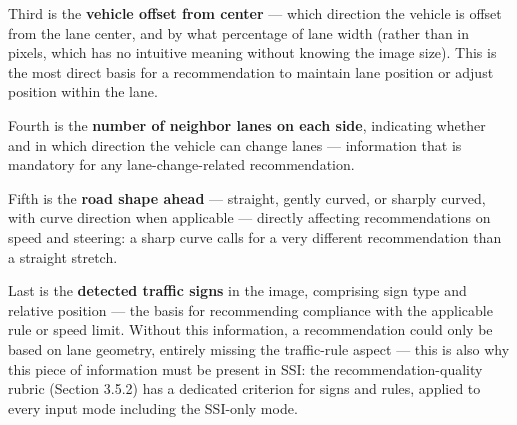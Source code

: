 \documentclass[12pt,a4paper]{report}
\begin{document}
Third is the \textbf{vehicle offset from center} --- which direction the vehicle is offset from the lane center, and by what percentage of lane width (rather than in pixels, which has no intuitive meaning without knowing the image size). This is the most direct basis for a recommendation to maintain lane position or adjust position within the lane.

Fourth is the \textbf{number of neighbor lanes on each side}, indicating whether and in which direction the vehicle can change lanes --- information that is mandatory for any lane-change-related recommendation.

Fifth is the \textbf{road shape ahead} --- straight, gently curved, or sharply curved, with curve direction when applicable --- directly affecting recommendations on speed and steering: a sharp curve calls for a very different recommendation than a straight stretch.

Last is the \textbf{detected traffic signs} in the image, comprising sign type and relative position --- the basis for recommending compliance with the applicable rule or speed limit. Without this information, a recommendation could only be based on lane geometry, entirely missing the traffic-rule aspect --- this is also why this piece of information must be present in SSI: the recommendation-quality rubric (Section 3.5.2) has a dedicated criterion for signs and rules, applied to every input mode including the SSI-only mode.
\end{document}
